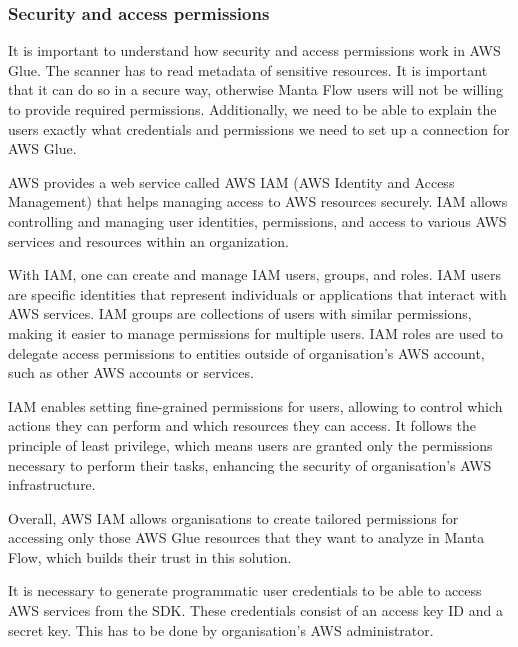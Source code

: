 \subsubsection{Security and access permissions}
It is important to understand how security and access permissions work in AWS Glue. The scanner has to read metadata of sensitive resources. It is important that it can do so in a secure way, otherwise Manta Flow users will not be willing to provide required permissions. Additionally, we need to be able to explain the users exactly what credentials and permissions we need to set up a connection for AWS Glue.
\par
AWS provides a web service called AWS IAM (AWS Identity and Access Management) that helps managing access to AWS resources securely. IAM allows controlling and managing user identities, permissions, and access to various AWS services and resources within an organization.
\par
With IAM, one can create and manage IAM users, groups, and roles. IAM users are specific identities that represent individuals or applications that interact with AWS services. IAM groups are collections of users with similar permissions, making it easier to manage permissions for multiple users. IAM roles are used to delegate access permissions to entities outside of organisation's AWS account, such as other AWS accounts or services.
\par
IAM enables setting fine-grained permissions for users, allowing to control which actions they can perform and which resources they can access. It follows the principle of least privilege, which means users are granted only the permissions necessary to perform their tasks, enhancing the security of organisation's AWS infrastructure.
\par
Overall, AWS IAM allows organisations to create tailored permissions for accessing only those AWS Glue resources that they want to analyze in Manta Flow, which builds their trust in this solution.
\par
It is necessary to generate programmatic user credentials to be able to access AWS services from the SDK. These credentials consist of an access key ID and a secret key. This has to be done by organisation's AWS administrator.

